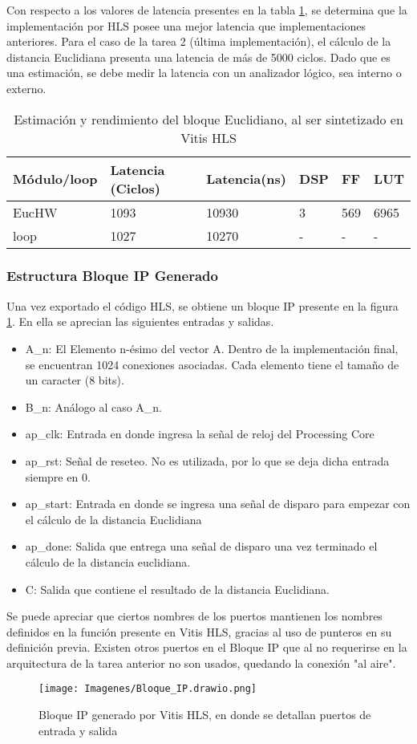 \documentclass[conference]{IEEEtran}
\begin{document}
Con respecto a los valores de latencia presentes en la tabla \ref{tab:Resource_estimate1}, se determina que la implementación por HLS posee una mejor latencia que implementaciones anteriores. Para el caso de la tarea 2 (última implementación), el cálculo de la distancia Euclidiana presenta una latencia de más de 5000 ciclos. Dado que es una estimación, se debe medir la latencia con un analizador lógico, sea interno o externo.

\begin{table}[!ht]
\caption{Estimación y rendimiento del bloque Euclidiano, al ser sintetizado en Vitis HLS}
\label{tab:Resource_estimate1}
\begin{tabular}{|l|l|l|l|l|l|}
\hline
Módulo/loop & Latencia (Ciclos) & Latencia(ns) & DSP & FF & LUT \\ \hline
EucHW & 1093 & 10930 & 3 & 569 & 6965 \\ \hline
loop & 1027 & 10270 & - & - & - \\ \hline
\end{tabular}
\end{table}

\subsubsection{Estructura Bloque IP Generado}
Una vez exportado el código HLS, se obtiene un bloque IP presente en la figura \ref{fig:HLS_block1}. En ella se aprecian las siguientes entradas y salidas.

\begin{itemize}
    \item A\_n: El Elemento n-ésimo del vector A. Dentro de la implementación final, se encuentran 1024 conexiones asociadas. Cada elemento tiene el tamaño de un caracter (8 bits).
    \item B\_n: Análogo al caso A\_n.
    \item ap\_clk: Entrada en donde ingresa la señal de reloj del Processing Core
    \item ap\_rst: Señal de reseteo. No es utilizada, por lo que se deja dicha entrada siempre en 0.
    \item ap\_start: Entrada en donde se ingresa una señal de disparo para empezar con el cálculo de la distancia Euclidiana
    \item ap\_done: Salida que entrega una señal de disparo una vez terminado el cálculo de la distancia euclidiana.
    \item C: Salida que contiene el resultado de la distancia Euclidiana.
\end{itemize}
Se puede apreciar que ciertos nombres de los puertos mantienen los nombres definidos en la función presente en Vitis HLS, gracias al uso de punteros en su definición previa. Existen otros puertos en el Bloque IP que al no requerirse en la arquitectura de la tarea anterior no son usados, quedando la conexión "al aire". 
\begin{figure}
    \centering
    \texttt{[image: Imagenes/Bloque\_IP.drawio.png]}
    \caption{Bloque IP generado por Vitis HLS, en donde se detallan puertos de entrada y salida}
    \label{fig:HLS_block1}
\end{figure}
\end{document}

